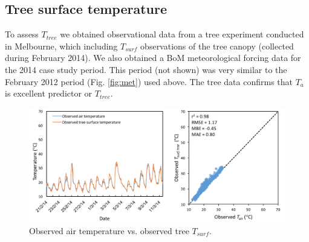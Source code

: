 \documentclass[gmd, manuscript]{copernicus}
\begin{document}
\subsection{Tree surface temperature}\label{app:tree_surf}  

To assess $T_{tree}$ we obtained observational data from a tree experiment conducted in Melbourne, which including $T_{surf}$ observations of the tree canopy (collected during February 2014). We also obtained a BoM meteorological forcing data for the 2014 case study period.  This period (not shown) was very similar to the February 2012 period (Fig. \ref{fig:met}) used above. The tree data confirms that \ensuremath{T_{a}} is excellent predictor or $T_{tree}$. 

\begin{figure}
\begin{center}
\end{center}
\includegraphics[width=1\textwidth,keepaspectratio]{figure13.png}
 \caption{Observed air temperature vs. observed tree $T_{surf}$.} \label{fig:TreeTsurfvsTair}
\end{figure}
\end{document}
